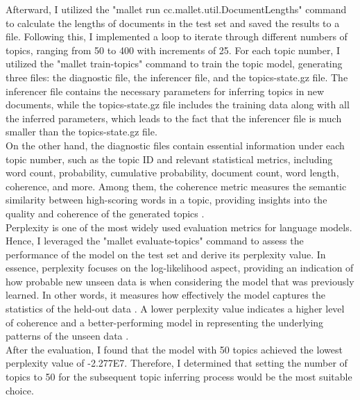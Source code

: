 Afterward, I utilized the "mallet run cc.mallet.util.DocumentLengths" command to calculate the lengths of documents in the test set and saved the results to a file. Following this, I implemented a loop to iterate through different numbers of topics, ranging from 50 to 400 with increments of 25. For each topic number, I utilized the "mallet train-topics" command to train the topic model, generating three files: the diagnostic file, the inferencer file, and the topics-state.gz file. The inferencer file contains the necessary parameters for inferring topics in new documents, while the topics-state.gz file includes the training data along with all the inferred parameters, which leads to the fact that the inferencer file is much smaller than the topics-state.gz file.\\

On the other hand, the diagnostic files contain essential information under each topic number, such as the topic ID and relevant statistical metrics, including word count, probability, cumulative probability, document count, word length, coherence, and more. Among them, the coherence metric measures the semantic similarity between high-scoring words in a topic, providing insights into the quality and coherence of the generated topics \citep{kapadia2022evaluate}.\\

Perplexity is one of the most widely used evaluation metrics for language models. Hence, I leveraged the "mallet evaluate-topics" command to assess the performance of the model on the test set and derive its perplexity value. In essence, perplexity focuses on the log-likelihood aspect, providing an indication of how probable new unseen data is when considering the model that was previously learned. In other words, it measures how effectively the model captures the statistics of the held-out data \citep{kapadia2022evaluate}. A lower perplexity value indicates a higher level of coherence and a better-performing model in representing the underlying patterns of the unseen data \citep{neishabouri2020reliability}.\\

After the evaluation, I found that the model with 50 topics achieved the lowest perplexity value of -2.277E7. Therefore, I determined that setting the number of topics to 50 for the subsequent topic inferring process would be the most suitable choice.\\

